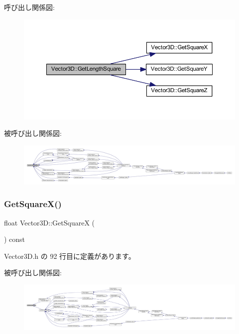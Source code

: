 呼び出し関係図\+:
\nopagebreak
\begin{figure}[H]
\begin{center}
\leavevmode
\includegraphics[width=350pt]{class_vector3_d_a0d486a19d3f7515e2f147c78bb73ce07_cgraph}
\end{center}
\end{figure}
被呼び出し関係図\+:
\nopagebreak
\begin{figure}[H]
\begin{center}
\leavevmode
\includegraphics[width=350pt]{class_vector3_d_a0d486a19d3f7515e2f147c78bb73ce07_icgraph}
\end{center}
\end{figure}
\mbox{\label{class_vector3_d_a77ee5fc836fd4024bd8bdae603b1677e}} 
\subsubsection{\texorpdfstring{Get\+Square\+X()}{GetSquareX()}}
{\footnotesize\ttfamily float Vector3\+D\+::\+Get\+SquareX (\begin{DoxyParamCaption}{ }\end{DoxyParamCaption}) const\hspace{0.3cm}{\ttfamily [inline]}}



 Vector3\+D.\+h の 92 行目に定義があります。

被呼び出し関係図\+:
\nopagebreak
\begin{figure}[H]
\begin{center}
\leavevmode
\includegraphics[width=350pt]{class_vector3_d_a77ee5fc836fd4024bd8bdae603b1677e_icgraph}
\end{center}
\end{figure}
\mbox{\label{class_vector3_d_a151d4791ff98d3f99d038c1dc372e0fc}} 
